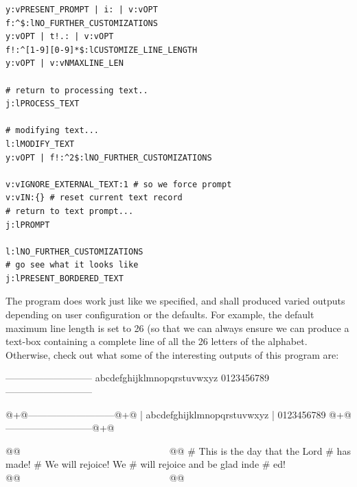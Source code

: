 \documentclass[a4paper, 18pt]{book} %
\begin{document}
{{{{\begin{tcolorbox}[teaterminalstyle, title=TEA Program: TEXT BEAUTIFIER v1, breakable]
\begin{lstlisting}[language=TEA,breaklines=true,]
y:vPRESENT_PROMPT | i: | v:vOPT
f:^$:lNO_FURTHER_CUSTOMIZATIONS
y:vOPT | t!.: | v:vOPT
f!:^[1-9][0-9]*$:lCUSTOMIZE_LINE_LENGTH
y:vOPT | v:vNMAXLINE_LEN 

# return to processing text..
j:lPROCESS_TEXT

# modifying text...
l:lMODIFY_TEXT
y:vOPT | f!:^2$:lNO_FURTHER_CUSTOMIZATIONS

v:vIGNORE_EXTERNAL_TEXT:1 # so we force prompt
v:vIN:{} # reset current text record
# return to text prompt...
j:lPROMPT

l:lNO_FURTHER_CUSTOMIZATIONS
# go see what it looks like
j:lPRESENT_BORDERED_TEXT
   \end{lstlisting}
  \end{tcolorbox}
  \caption{TEA APPLICATION: TEXT BEAUTIFIER --- a configurable and special text-box drawer implemented using TEA}
  \label{FIGYAPP1}
}


\vspace{2em}


The program does work just like we specified, and shall produced varied outputs depending on user configuration or the defaults. For example, the default maximum line length is set to 26 (so that we can always ensure we can produce a text-box containing a complete line of all the 26 letters of the alphabet. Otherwise, check out what some of the interesting outputs of this program are:


 \vspace{2em}
 \begin{tcbverbatim}[title=Sample OUTPUT 1 from TEXT BEAUTIFIER v1]
---------------------------
abcdefghijklmnopqrstuvwxyz
0123456789
---------------------------
  \end{tcbverbatim}
 \vspace{2em}



 \vspace{2em}
 \begin{tcbverbatim}[title=Sample OUTPUT 2 from TEXT BEAUTIFIER v1]
@+@---------------------------@+@
| abcdefghijklmnopqrstuvwxyz
| 0123456789
@+@---------------------------@+@
  \end{tcbverbatim}
 \vspace{2em}
 
 
  \vspace{2em}
 \begin{tcbverbatim}[title=Sample OUTPUT 3 from TEXT BEAUTIFIER v1]
@@~~~~~~~~~~~~~~~~~~~~~~~~~~~~~~~@@
# This is the day that the Lord 
# has made!
# We will rejoice! We 
# will rejoice and be glad inde
# ed!
@@~~~~~~~~~~~~~~~~~~~~~~~~~~~~~~~@@
  \end{tcbverbatim}
 \vspace{2em}
 
}}}
\end{document}
